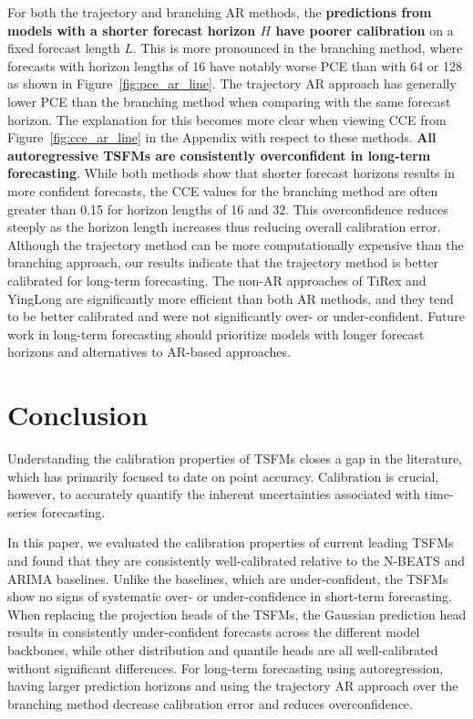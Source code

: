 \documentclass{article}
\begin{document}
For both the trajectory and branching AR methods, the \textbf{predictions from models with a shorter forecast horizon $H$ have poorer calibration} on a fixed forecast length $L$.
This is more pronounced in the branching method, where forecasts with horizon lengths of 16 have notably worse PCE than with 64 or 128 as shown in Figure~\ref{fig:pce_ar_line}.
The trajectory AR approach has generally lower PCE than the branching method when comparing with the same forecast horizon.
The explanation for this becomes more clear when viewing CCE from Figure~\ref{fig:cce_ar_line} in the Appendix with respect to these methods.
\textbf{All autoregressive TSFMs are consistently overconfident in long-term forecasting}.
While both methods show that shorter forecast horizons results in more confident forecasts, the CCE values for the branching method are often greater than 0.15 for horizon lengths of 16 and 32.
This overconfidence reduces steeply as the horizon length increases thus reducing overall calibration error.
Although the trajectory method can be more computationally expensive than the branching approach, our results indicate that the trajectory method is better calibrated for long-term forecasting.
The non-AR approaches of TiRex and YingLong are significantly more efficient than both AR methods, and they tend to be better calibrated and were not significantly over- or under-confident.
Future work in long-term forecasting should prioritize models with longer forecast horizons and alternatives to AR-based approaches. 

\section{Conclusion}
\label{sec:conclusion}

Understanding the calibration properties of TSFMs closes a gap in the literature, which has primarily focused to date on point accuracy. 
Calibration is crucial, however, to accurately quantify the inherent uncertainties associated with time-series forecasting.

In this paper, we evaluated the calibration properties of current leading TSFMs and found that they are consistently well-calibrated relative to the N-BEATS and ARIMA baselines.
Unlike the baselines, which are under-confident, the TSFMs show no signs of systematic over- or under-confidence in short-term forecasting.
When replacing the projection heads of the TSFMs, the Gaussian prediction head results in consistently under-confident forecasts across the different model backbones, while other distribution and quantile heads are all well-calibrated without significant differences.
For long-term forecasting using autoregression, having larger prediction horizons and using the trajectory AR approach over the branching method decrease calibration error and reduces overconfidence.
\end{document}

